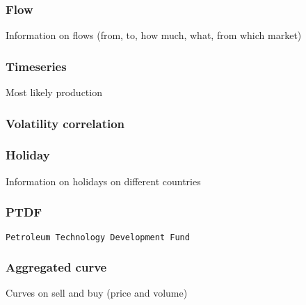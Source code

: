        \subsubsection{Flow}
            Information on flows (from, to, how much, what, from which market)
            
        \subsubsection{Timeseries}
            Most likely production
            
        \subsubsection{Volatility correlation}
            
            
        \subsubsection{Holiday}
            Information on holidays on different countries
            
        \subsubsection{PTDF}
            \texttt{Petroleum Technology Development Fund}
            
        \subsubsection{Aggregated curve}
            Curves on sell and buy (price and volume)
    
    